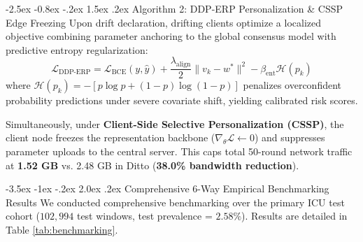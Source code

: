 \documentclass[11pt, a4paper]{article}
\makeatletter
\renewcommand\section{\@startsection {section}{1}{\z@}%
                                   {-3.5ex \@plus -1ex \@minus -.2ex}%
                                   {2.0ex \@plus.2ex}%
                                   {\normalfont\large\bfseries\color{amritaMaroon}}}
\renewcommand\subsection{\@startsection {subsection}{2}{\z@}%
                                   {-2.5ex \@plus -0.8ex \@minus -.2ex}%
                                   {1.5ex \@plus.2ex}%
                                   {\normalfont\normalsize\bfseries\color{slateNavy}}}
\makeatother
\begin{document}
\subsection{Algorithm 2: DDP-ERP Personalization \& CSSP Edge Freezing}
Upon drift declaration, drifting clients optimize a localized objective combining parameter anchoring to the global consensus model with predictive entropy regularization:
\begin{equation}
\mathcal{L}_{\text{DDP-ERP}} = \mathcal{L}_{\text{BCE}}(y, \hat{y}) + \frac{\lambda_{\text{align}}}{2} \|v_k - w^*\|^2 - \beta_{\text{ent}} \mathcal{H}(p_k)
\end{equation}
where $\mathcal{H}(p_k) = - [p \log p + (1-p) \log (1-p)]$ penalizes overconfident probability predictions under severe covariate shift, yielding calibrated risk scores.

Simultaneously, under \textbf{Client-Side Selective Personalization (CSSP)}, the client node freezes the representation backbone ($\nabla_\theta \mathcal{L} \leftarrow 0$) and suppresses parameter uploads to the central server. This caps total 50-round network traffic at \textbf{1.52 GB} vs. 2.48 GB in Ditto (\textbf{38.0\% bandwidth reduction}).

\section{Comprehensive 6-Way Empirical Benchmarking Results}
We conducted comprehensive benchmarking over the primary ICU test cohort ($102,994$ test windows, test prevalence = $2.58\%$). Results are detailed in Table \ref{tab:benchmarking}.
\end{document}

